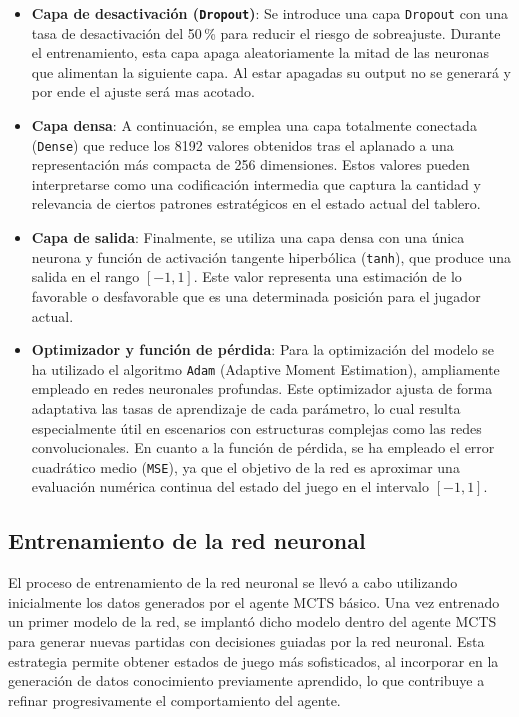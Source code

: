 \documentclass[conference]{IEEEtran}
\begin{document}
\begin{itemize}
\item \textbf{Capa de desactivación (\texttt{Dropout})}: Se introduce una capa \texttt{Dropout} con una tasa de desactivación del 50\,\% para reducir el riesgo de sobreajuste. Durante el entrenamiento, esta capa apaga aleatoriamente la mitad de las neuronas que alimentan la siguiente capa. Al estar apagadas su output no se generará y por ende el ajuste será mas acotado.

\item \textbf{Capa densa}: A continuación, se emplea una capa totalmente conectada (\texttt{Dense}) que reduce los 8192 valores obtenidos tras el aplanado a una representación más compacta de 256 dimensiones. Estos valores pueden interpretarse como una codificación intermedia que captura la cantidad y relevancia de ciertos patrones estratégicos en el estado actual del tablero.

\item \textbf{Capa de salida}: Finalmente, se utiliza una capa densa con una única neurona y función de activación tangente hiperbólica (\texttt{tanh}), que produce una salida en el rango $[-1, 1]$. Este valor representa una estimación de lo favorable o desfavorable que es una determinada posición para el jugador actual.

    \item \textbf{Optimizador y función de pérdida}: Para la optimización del modelo se ha utilizado el algoritmo \texttt{Adam} (Adaptive Moment Estimation), ampliamente empleado en redes neuronales profundas. Este optimizador ajusta de forma adaptativa las tasas de aprendizaje de cada parámetro, lo cual resulta especialmente útil en escenarios con estructuras complejas como las redes convolucionales. En cuanto a la función de pérdida, se ha empleado el error cuadrático medio (\texttt{MSE}), ya que el objetivo de la red es aproximar una evaluación numérica continua del estado del juego en el intervalo $[-1, 1]$.
\end{itemize}


\subsection{Entrenamiento de la red neuronal}

El proceso de entrenamiento de la red neuronal se llevó a cabo utilizando inicialmente los datos generados por el agente MCTS básico. Una vez entrenado un primer modelo de la red, se implantó dicho modelo dentro del agente MCTS para generar nuevas partidas con decisiones guiadas por la red neuronal. Esta estrategia permite obtener estados de juego más sofisticados, al incorporar en la generación de datos conocimiento previamente aprendido, lo que contribuye a refinar progresivamente el comportamiento del agente.
\end{document}

